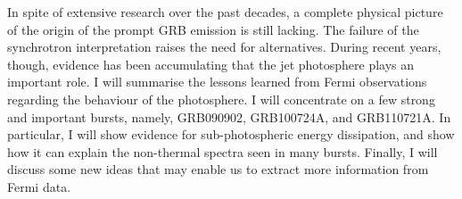 


\bigskip



\bigskip

\noindent In spite of extensive research over the past decades, a complete physical picture of the origin of the prompt GRB emission is still lacking. The failure of the synchrotron interpretation raises the need for alternatives.  During recent years, though, evidence has been  accumulating that the jet photosphere plays an important role.   I will summarise the lessons learned from Fermi observations regarding the behaviour of the photosphere.  I will concentrate on a few strong and important bursts, namely, GRB090902, GRB100724A, and GRB110721A.   In particular, I will show evidence for sub-photospheric energy dissipation, and show how it can explain the non-thermal spectra seen in many bursts.  Finally, I will discuss some new ideas that may enable us to extract more information from Fermi data.

